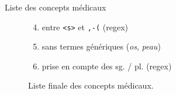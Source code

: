\begin{frame}{Liste des concepts médicaux}
\begin{figure}[!htb]
\begin{minipage}{.5\textwidth}
        \caption{Liste finale des concepts médicaux.}
        \label{fig:prob1_6_2}
    \end{minipage}%
    \begin{minipage}{.6\textwidth}
        \centering
   \begin{enumerate}
   \setcounter{enumi}{3}
   \item entre \texttt{<s>} et \texttt{,-(} (regex)
   \item sans termes génériques (\textit{os}, \textit{peau})
\item prise en compte des sg. / pl. (regex)
   \end{enumerate}
    \end{minipage}
\end{figure}
\end{frame}


